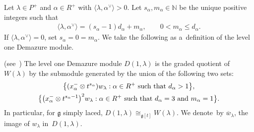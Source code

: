 \documentclass[pdftex]{sigma}
\numberwithin{equation}{section}
\begin{document}
Let $\lambda\in P^{+}$ and $\alpha\in R^{+}$ with $\langle \lambda, \alpha^{\vee}\rangle > 0$.
Let $s_\alpha, m_\alpha \in \mathbb{N}$ be the unique positive integers such that
\begin{gather*}
\langle \lambda, \alpha^{\vee}\rangle = (s_\alpha-1)d_\alpha + m_\alpha,
\qquad
0<m_\alpha\leq d_\alpha.
\end{gather*}
If $\langle \lambda, \alpha^{\vee}\rangle = 0$, set $s_\alpha=0=m_\alpha$.
We take the following as a~def\/inition of the level one Demazure module.
\begin{definition}
\textup{(see~\cite[Corollary 3.5]{CV})} The level one Demazure module $D(1,\lambda)$ is the graded quotient of
$W(\lambda)$ by the submodule generated by the union of the following two sets:
\begin{gather}
\big\{(x^{-}_{\alpha} \otimes t^{s_{\alpha}})  w_{\lambda}: \alpha\in R^{+}~\textup{such that}~d_{\alpha} > 1\big\},
\label{dm1}
\\
\big\{\big(x^{-}_{\alpha} \otimes t^{s_{\alpha}-1}\big)^2  w_{\lambda}: \alpha\in R^{+}~\textup{such that}~d_\alpha =3~\textup{and}~m_\alpha=1\big\}.
\label{dm2}
\end{gather}
In particular, for $\mathfrak{g}$ simply laced, $D(1,\lambda)\cong_{\mathfrak{g}[t]} W(\lambda)$. We denote~by
$\overline{w}_\lambda$, the image of $w_\lambda$ in~$D(1,\lambda)$.
\end{definition}
\end{document}
